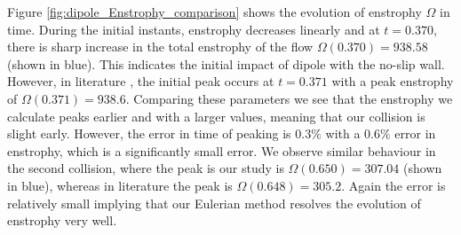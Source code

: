 

Figure \ref{fig:dipole_Enstrophy_comparison} shows the evolution of enstrophy $\Omega$ in time. During the initial instants, enstrophy decreases linearly and at $t=0.370$, there is sharp increase in the total enstrophy of the flow $\Omega(0.370) = 938.58$ (shown in blue). This indicates the initial impact of dipole with the no-slip wall. However, in literature \cite{Clercx2006a}, the initial peak occurs at $t=0.371$ with a peak enstrophy of $\Omega(0.371)=938.6$. Comparing these parameters we see that the enstrophy we calculate peaks earlier and with a larger values, meaning that our collision is slight early. However, the error in time of peaking is $0.3\%$ with a $0.6\%$ error in enstrophy, which is a significantly small error. We observe similar behaviour in the second collision, where the peak is our study is $\Omega(0.650)=307.04$ (shown in blue), whereas in literature the peak is $\Omega(0.648) = 305.2$. Again the error is relatively small implying that our Eulerian method resolves the evolution of enstrophy very well.



